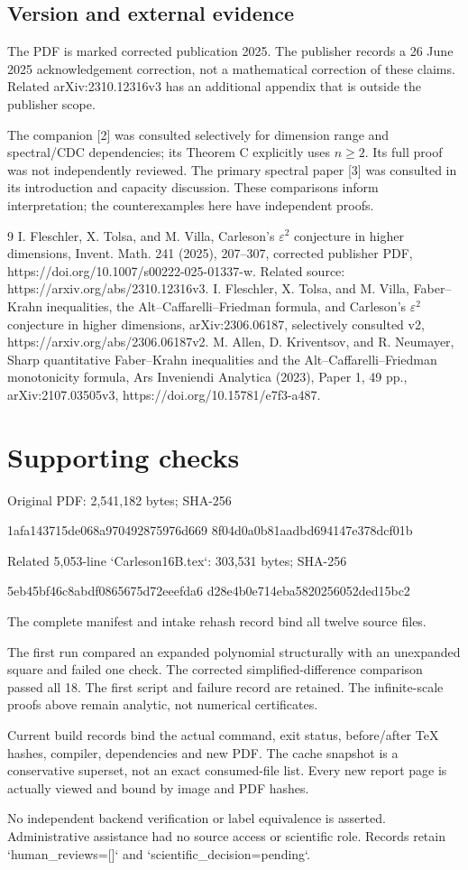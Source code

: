 \documentclass[10pt]{article}
\begin{document}
\subsection*{Version and external evidence}
The PDF is marked corrected publication 2025. The publisher records a 26 June 2025 acknowledgement correction, not a mathematical correction of these claims. Related arXiv:2310.12316v3 has an additional appendix that is outside the publisher scope.\par
The companion [2] was consulted selectively for dimension range and spectral/CDC dependencies; its Theorem C explicitly uses \(n\ge2\). Its full proof was not independently reviewed. The primary spectral paper [3] was consulted in its introduction and capacity discussion. These comparisons inform interpretation; the counterexamples here have independent proofs.\par
9 I. Fleschler, X. Tolsa, and M. Villa, Carleson’s \(\varepsilon^2\) conjecture in higher dimensions, Invent. Math. 241 (2025), 207–307, corrected publisher PDF, https://doi.org/10.1007/s00222-025-01337-w. Related source: https://arxiv.org/abs/2310.12316v3. I. Fleschler, X. Tolsa, and M. Villa, Faber–Krahn inequalities, the Alt–Caffarelli–Friedman formula, and Carleson’s \(\varepsilon^2\) conjecture in higher dimensions, arXiv:2306.06187, selectively consulted v2, https://arxiv.org/abs/2306.06187v2. M. Allen, D. Kriventsov, and R. Neumayer, Sharp quantitative Faber–Krahn inequalities and the Alt–Caffarelli–Friedman monotonicity formula, Ars Inveniendi Analytica (2023), Paper 1, 49 pp., arXiv:2107.03505v3, https://doi.org/10.15781/e7f3-a487.\par
\section*{Supporting checks}
Original PDF: 2,541,182 bytes; SHA-256\par
1afa143715de068a970492875976d669
8f04d0a0b81aadbd694147e378dcf01b\par
Related 5,053-line `Carleson16B.tex`: 303,531 bytes; SHA-256\par
5eb45bf46c8abdf0865675d72eeefda6
d28e4b0e714eba5820256052ded15bc2\par
The complete manifest and intake rehash record bind all twelve source files.\par
The first run compared an expanded polynomial structurally with an unexpanded square and failed one check. The corrected simplified-difference comparison passed all 18. The first script and failure record are retained. The infinite-scale proofs above remain analytic, not numerical certificates.\par
Current build records bind the actual command, exit status, before/after TeX hashes, compiler, dependencies and new PDF. The cache snapshot is a conservative superset, not an exact consumed-file list. Every new report page is actually viewed and bound by image and PDF hashes.\par
No independent backend verification or label equivalence is asserted. Administrative assistance had no source access or scientific role. Records retain `human\_reviews=[]` and `scientific\_decision=pending`.\par
\end{document}
